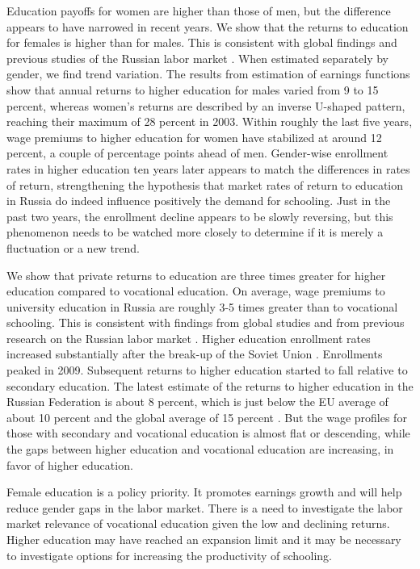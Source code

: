 \documentclass[alpha-refs]{wiley-article-01g}
\begin{document}
Education payoffs for women are higher than those of men, but the difference appears to have narrowed in recent years. We show that the returns to education for females is higher than for males. This is consistent with global findings \parencite{Psacharopoulos_Patrinos2018}  and previous studies of the Russian labor market \parencite{Cheidvasser2007,Lukyanova2010}. When estimated separately by gender, we find trend variation. The results from estimation of earnings functions show that annual returns to higher education for males varied from 9 to 15 percent, whereas women's returns are described by an inverse U-shaped pattern, reaching their maximum of 28 percent in 2003. Within roughly the last five years, wage premiums to higher education for women have stabilized at around 12 percent, a couple of percentage points ahead of men. Gender-wise enrollment rates in higher education ten years later appears to match the differences in rates of return, strengthening the hypothesis that market rates of return to education in Russia do indeed influence positively the demand for schooling. Just in the past two years, the enrollment decline appears to be slowly reversing, but this phenomenon needs to be watched more closely to determine if it is merely a fluctuation or a new trend.

We show that private returns to education are three times greater for higher education compared to vocational education. On average, wage premiums to university education in Russia are roughly 3-5 times greater than to vocational schooling. This is consistent with findings from global studies and from previous research on the Russian labor market \parencite{Borisov2007, Carnoy2012}. Higher education enrollment rates increased substantially after the break-up of the Soviet Union \parencite{Belskaya2014}. Enrollments peaked in 2009. Subsequent returns to higher education started to fall relative to secondary education. The latest estimate of the returns to higher education in the Russian Federation is about 8 percent, which is just below the EU average of about 10 percent and the global average of 15 percent \parencite{Psacharopoulos_Patrinos2018}. But the wage profiles for those with secondary and vocational education is almost flat or descending, while the gaps between higher education and vocational education are increasing, in favor of higher education. 

Female education is a policy priority. It promotes earnings growth and will help reduce gender gaps in the labor market.  There is a need to investigate the labor market relevance of vocational education given the low and declining returns. Higher education may have reached an expansion limit and it may be necessary to investigate options for increasing the productivity of schooling.
\end{document}

